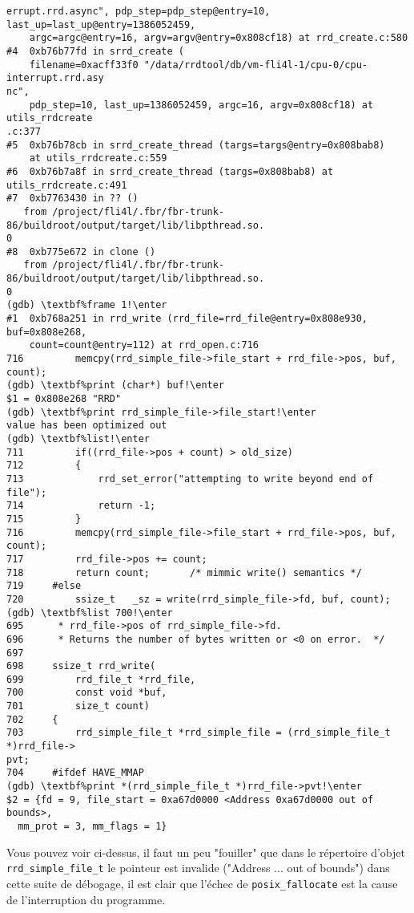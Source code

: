 \begin{example}
\begin{Verbatim}[commandchars=\\\%!]
errupt.rrd.async", pdp_step=pdp_step@entry=10, last_up=last_up@entry=1386052459,
    argc=argc@entry=16, argv=argv@entry=0x808cf18) at rrd_create.c:580
#4  0xb76b77fd in srrd_create (
    filename=0xacff33f0 "/data/rrdtool/db/vm-fli4l-1/cpu-0/cpu-interrupt.rrd.asy
nc",
    pdp_step=10, last_up=1386052459, argc=16, argv=0x808cf18) at utils_rrdcreate
.c:377
#5  0xb76b78cb in srrd_create_thread (targs=targs@entry=0x808bab8)
    at utils_rrdcreate.c:559
#6  0xb76b7a8f in srrd_create_thread (targs=0x808bab8) at utils_rrdcreate.c:491
#7  0xb7763430 in ?? ()
   from /project/fli4l/.fbr/fbr-trunk-86/buildroot/output/target/lib/libpthread.so.
0
#8  0xb775e672 in clone ()
   from /project/fli4l/.fbr/fbr-trunk-86/buildroot/output/target/lib/libpthread.so.
0
(gdb) \textbf%frame 1!\enter
#1  0xb768a251 in rrd_write (rrd_file=rrd_file@entry=0x808e930, buf=0x808e268,
    count=count@entry=112) at rrd_open.c:716
716         memcpy(rrd_simple_file->file_start + rrd_file->pos, buf, count);
(gdb) \textbf%print (char*) buf!\enter
$1 = 0x808e268 "RRD"
(gdb) \textbf%print rrd_simple_file->file_start!\enter
value has been optimized out
(gdb) \textbf%list!\enter
711         if((rrd_file->pos + count) > old_size)
712         {
713             rrd_set_error("attempting to write beyond end of file");
714             return -1;
715         }
716         memcpy(rrd_simple_file->file_start + rrd_file->pos, buf, count);
717         rrd_file->pos += count;
718         return count;       /* mimmic write() semantics */
719     #else
720         ssize_t   _sz = write(rrd_simple_file->fd, buf, count);
(gdb) \textbf%list 700!\enter
695      * rrd_file->pos of rrd_simple_file->fd.
696      * Returns the number of bytes written or <0 on error.  */
697
698     ssize_t rrd_write(
699         rrd_file_t *rrd_file,
700         const void *buf,
701         size_t count)
702     {
703         rrd_simple_file_t *rrd_simple_file = (rrd_simple_file_t *)rrd_file->
pvt;
704     #ifdef HAVE_MMAP
(gdb) \textbf%print *(rrd_simple_file_t *)rrd_file->pvt!\enter
$2 = {fd = 9, file_start = 0xa67d0000 <Address 0xa67d0000 out of bounds>,
  mm_prot = 3, mm_flags = 1}
\end{Verbatim}
\end{example}

Vous pouvez voir ci-dessus, il faut un peu "fouiller" que dans le répertoire
d'objet \texttt{rrd\_simple\_file\_t} le pointeur est invalide ("Address ... out
of bounds") dans cette suite de débogage, il est clair que l'échec de \texttt{posix\_fallocate}
est la cause de l'interruption du programme.

